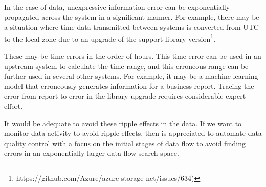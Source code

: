 			In the case of data, unexpressive information error can be exponentially propagated across the system in a significant manner. For example, there may be a situation where time data transmitted between systems is converted from UTC to the local zone due to an upgrade of the support library version\footnote{https://github.com/Azure/azure-storage-net/issues/634)}. 
			
			These may be time errors in the order of hours. This time error can be used in an upstream system to calculate the time range, and this erroneous range can be further used in several other systems. For example, it may be a machine learning model that erroneously generates information for a business report. Tracing the error from report to error in the library upgrade requires considerable expert effort.
			
			It would be adequate to avoid these ripple effects in the data. If we want to monitor data activity to avoid ripple effects, then is appreciated to automate data quality control with a focus on the initial stages of data flow to avoid finding errors in an exponentially larger data flow search space.